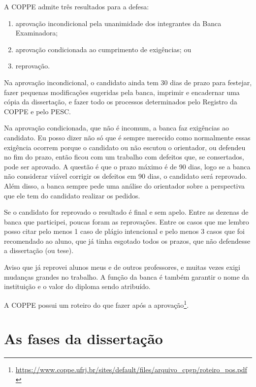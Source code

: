 \documentclass{book}
\begin{document}
A COPPE admite três resultados para a defesa:
\begin{enumerate}
\item aprovação incondicional pela unanimidade dos integrantes da Banca Examinadora;
\item aprovação condicionada ao cumprimento de exigências; ou
\item reprovação.
\end{enumerate}

Na aprovação incondicional, o candidato ainda tem 30 dias de prazo para festejar, fazer pequenas modificações sugeridas pela banca, imprimir e encadernar uma cópia da dissertação, e fazer todo os processos determinados pelo Registro da COPPE e pelo PESC.

Na aprovação condicionada, que não é incomum, a banca faz exigências ao candidato. Eu posso dizer não só que é sempre merecido como normalmente essas exigência ocorrem porque o candidato ou não escutou o orientador, ou defendeu no fim do prazo, então ficou com um trabalho com defeitos que, se consertados, pode ser aprovado. A questão é que o prazo máximo é de 90 dias, logo se a banca não considerar viável corrigir os defeitos em 90 dias, o candidato será reprovado. Além disso, a banca sempre pede uma análise do orientador sobre a perspectiva que ele tem do candidato realizar os pedidos.

Se o candidato for reprovado o resultado é final e sem apelo. Entre as dezenas de banca que participei, poucas foram as reprovações. Entre os casos que me lembro posso citar pelo menos 1 caso de plágio intencional e pelo menos 3 casos que foi recomendado ao aluno, que já tinha esgotado todos os prazos, que não defendesse a dissertação (ou tese). 

Aviso que já reprovei alunos meus e de outros professores, e muitas vezes exigi mudanças grandes no trabalho. A função da banca é também garantir o nome da instituição e o valor do diploma sendo atribuído.

A COPPE possui um roteiro do que fazer após a aprovação\footnote{\url{https://www.coppe.ufrj.br/sites/default/files/arquivo_cpgp/roteiro_pos.pdf}}.



\chapter{As fases da dissertação}
\end{document}
